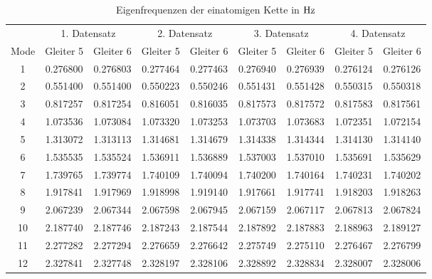\documentclass[a4paper,titlepage]{scrartcl}
\numberwithin{equation}{section}
\begin{document}
\begin{table}[H]
\centering
\tabcolsep=0.11cm
\begin{tabular}{ccccccccc}
\toprule
& \multicolumn{2}{c}{1. Datensatz} & \multicolumn{2}{c}{2. Datensatz} & \multicolumn{2}{c}{3. Datensatz} & \multicolumn{2}{c}{4. Datensatz}\\
\cmidrule(r){2-3} \cmidrule(r){4-5} \cmidrule(r){6-7} \cmidrule(r){8-9}
Mode & Gleiter 5 & Gleiter 6 & Gleiter 5 & Gleiter 6 & Gleiter 5 & Gleiter 6 & Gleiter 5 & Gleiter 6\\
\hline
1 & 0.276800 & 0.276803 & 0.277464 & 0.277463 & 0.276940 & 0.276939 & 0.276124 & 0.276126\\
2 & 0.551400 & 0.551400 & 0.550223 & 0.550246 & 0.551431 & 0.551428 & 0.550315 & 0.550318\\
3 & 0.817257 & 0.817254 & 0.816051 & 0.816035 & 0.817573 & 0.817572 & 0.817583 & 0.817561\\
4 & 1.073536 & 1.073084 & 1.073320 & 1.073253 & 1.073703 & 1.073683 & 1.072351 & 1.072154\\
5 & 1.313072 & 1.313113 & 1.314681 & 1.314679 & 1.314338 & 1.314344 & 1.314130 & 1.314140\\
6 & 1.535535 & 1.535524 & 1.536911 & 1.536889 & 1.537003 & 1.537010 & 1.535691 & 1.535629\\
7 & 1.739765 & 1.739774 & 1.740109 & 1.740094 & 1.740200 & 1.740164 & 1.740231 & 1.740202\\
8 & 1.917841 & 1.917969 & 1.918998 & 1.919140 & 1.917661 & 1.917741 & 1.918203 & 1.918263\\
9 & 2.067239 & 2.067344 & 2.067598 & 2.067945 & 2.067159 & 2.067117 & 2.067813 & 2.067824\\
10 & 2.187740 & 2.187746 & 2.187243 & 2.187544 & 2.187892 & 2.187883 & 2.188963 & 2.189127\\
11 & 2.277282 & 2.277294 & 2.276659 & 2.276642 & 2.275749 & 2.275110 & 2.276467 & 2.276799\\
12 & 2.327841 & 2.327748 & 2.328197 & 2.328106 & 2.328892 & 2.328834 & 2.328007 & 2.328006\\
\bottomrule
\end{tabular}
\caption{Eigenfrequenzen der einatomigen Kette in $\unit[]{Hz}$}
\label{tab:eigenfreqEinatom}
\end{table}
\end{document}
